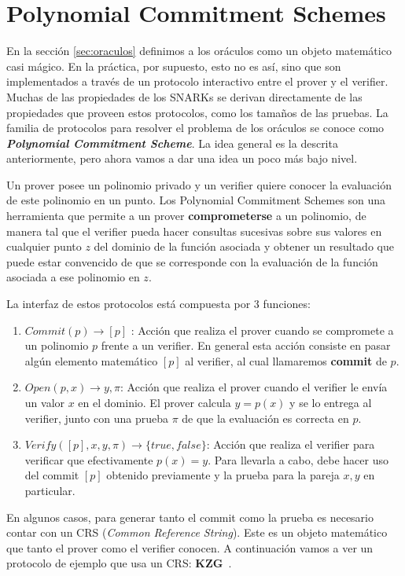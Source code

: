 \chapter{Polynomial Commitment Schemes}
En la sección \ref{sec:oraculos} definimos a los oráculos como un objeto matemático casi mágico. En la práctica, por supuesto, esto no es así, sino que son implementados a través de un protocolo interactivo entre el prover y el verifier. Muchas de las propiedades de los SNARKs se derivan directamente de las propiedades que proveen estos protocolos, como los tamaños de las pruebas. La familia de protocolos para resolver el problema de los oráculos se conoce como \textbf{\textit{Polynomial Commitment Scheme}}\cite{kate2010constant}. La idea general es la descrita anteriormente, pero ahora vamos a dar una idea un poco más bajo nivel.

Un prover posee un polinomio privado y un verifier quiere conocer la evaluación de este polinomio en un punto. Los Polynomial Commitment Schemes son una herramienta que permite a un prover \textbf{comprometerse} a un polinomio, de manera tal que el verifier pueda hacer consultas sucesivas sobre sus valores en cualquier punto $z$ del dominio de la función asociada y obtener un resultado que puede estar convencido de que se corresponde con la evaluación de la función asociada a ese polinomio en $z$.

La interfaz de estos protocolos está compuesta por 3 funciones:
\begin{enumerate}
    \item $Commit(p) \rightarrow [p]$ : Acción que realiza el prover cuando se compromete a un polinomio $p$ frente a un verifier. En general esta acción consiste en pasar algún elemento matemático $[p]$ al verifier, al cual llamaremos \textbf{commit} de $p$.
    \item $Open(p, x) \rightarrow y,\pi$: Acción que realiza el prover cuando el verifier le envía un valor $x$ en el dominio. El prover calcula $y = p(x)$ y se lo entrega al verifier, junto con una prueba $\pi$ de que la evaluación es correcta en $p$.
    \item $Verify([p], x, y, \pi) \rightarrow \{true, false\}$: Acción que realiza el verifier para verificar que efectivamente $p(x) = y$. Para llevarla a cabo, debe hacer uso del commit $[p]$ obtenido previamente y la prueba para la pareja $x, y$ en particular.
\end{enumerate}

En algunos casos, para generar tanto el commit como la prueba es necesario contar con un CRS (\textit{Common Reference String}). Este es un objeto matemático que tanto el prover como el verifier conocen. A continuación vamos a ver un protocolo de ejemplo que usa un CRS: \textbf{KZG}~\cite{ConstantSizeCommitmentstoPolynomialsandTheirApplications}.

